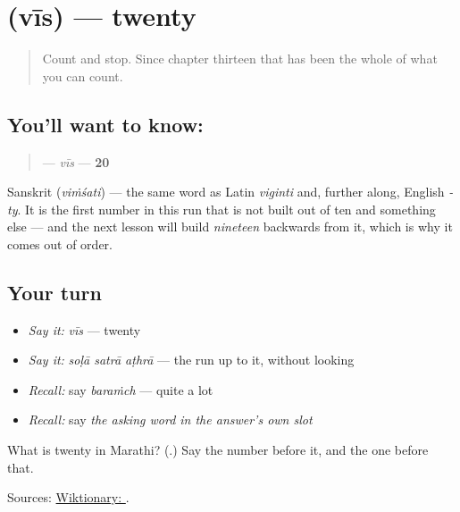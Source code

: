 \section[\texorpdfstring{\mr{वीस} (vīs)}{वीस (vīs)}]{ (vīs) — twenty}

\label{lesson:MR-C58-vis}



\begin{quote}
Count \textbf{    } and stop. Since chapter thirteen that has been the whole of what you can count.
\end{quote}

\subsection*{You'll want to know: }
\begin{quote}
\textbf{} — \emph{vīs} — \textbf{20}
\end{quote}

Sanskrit \textbf{} (\emph{viṁśati}) — the same word as Latin \emph{viginti} and, further along, English \emph{-ty}. It is the first number in this run that is not built out of ten and something else — and the next lesson will build \emph{nineteen} backwards from it, which is why it comes out of order.

\subsection*{Your turn}
\begin{itemize}
\raggedright
  \item \emph{Say it:} \emph{vīs} — twenty
  \item \emph{Say it:} \emph{soḷā satrā aṭhrā} — the run up to it, without looking
  \item \emph{Recall:} say \emph{baraṁch} — quite a lot
  \item \emph{Recall:} say \emph{the asking word in the answer's own slot}
\end{itemize}

\begin{tcolorbox}[breakable,colback=teal!4,colframe=teal!35!black,title={Before you move on}]
What is twenty in Marathi? (\textbf{}.) Say the number before it, and the one before that.

Sources: \href{https://en.wiktionary.org/wiki/\%E0\%A4\%B5\%E0\%A5\%80\%E0\%A4\%B8}{Wiktionary: }.
\end{tcolorbox}
